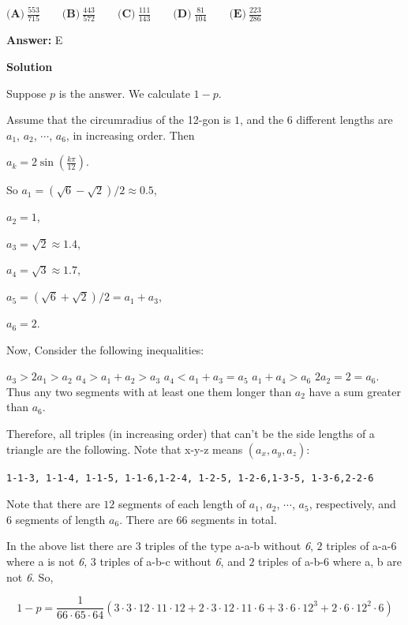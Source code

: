 \begin{enumerate}
 $\textbf{(A)} \ \frac{553}{715} \qquad \textbf{(B)} \ \frac{443}{572} \qquad \textbf{(C)} \ \frac{111}{143} \qquad \textbf{(D)} \ \frac{81}{104} \qquad \textbf{(E)} \ \frac{223}{286}$

 \textbf{Answer: }E



\textbf{Solution}

Suppose $p$ is the answer. We calculate $1-p$.

 Assume that the circumradius of the 12-gon is $1$, and the 6 different lengths are $a_1$, $a_2$, $\cdots$, $a_6$, in increasing order. Then

 $a_k = 2\sin ( \frac{k\pi}{12} )$. 

 So $a_1=(\sqrt{6}-\sqrt{2})/2 \approx 0.5$, 

 $a_2=1$,

 $a_3=\sqrt{2}\approx 1.4$, 

 $a_4=\sqrt{3}\approx 1.7$,

 $a_5=(\sqrt{6}+\sqrt{2})/2 = a_1 + a_3$,

 $a_6 = 2$.

 


 Now, Consider the following inequalities:

 $a_3>2a_1 > a_2$
$a_4> a_1 + a_2>a_3$
$a_4<a_1 + a_3=a_5$
$a_1 + a_4 > a_6$
$2a_2 = 2 = a_6$. Thus any two segments with at least one them longer than $a_2$ have a sum greater than $a_6$.

 Therefore, all triples (in increasing order) that can't be the side lengths of a triangle are the following. Note that x-y-z means $(a_x, a_y, a_z)$:

 \begin{verbatim}
1-1-3, 1-1-4, 1-1-5, 1-1-6,1-2-4, 1-2-5, 1-2-6,1-3-5, 1-3-6,2-2-6
\end{verbatim}

Note that there are $12$ segments of each length of $a_1$, $a_2$, $\cdots$, $a_5$, respectively, and $6$ segments of length $a_6$. There are $66$ segments in total.

 In the above list there are $3$ triples of the type a-a-b without \textit{6}, $2$ triples of a-a-6 where a is not \textit{6}, $3$ triples of a-b-c without \textit{6}, and $2$ triples of a-b-6 where a, b are not \textit{6}. So,

 
 \[1-p = \frac{1}{66\cdot 65\cdot 64} ( 3\cdot 3 \cdot 12\cdot 11\cdot 12 + 2\cdot 3 \cdot 12\cdot 11\cdot 6 + 3\cdot 6\cdot 12^3 + 2\cdot 6 \cdot 12^2 \cdot 6)\]


\end{enumerate}
